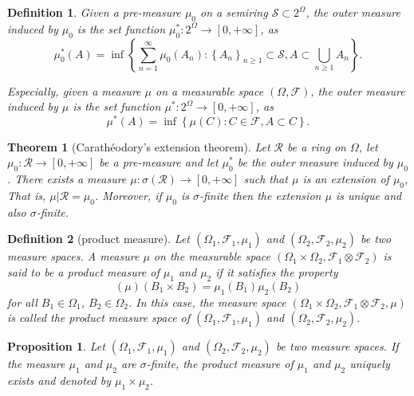 \documentclass{report}
\newtheorem{definition}{Definition}[section]
\newtheorem{theorem}{Theorem}[section]
\newtheorem{proposition}{Proposition}[section]
\theoremstyle{nonumberplain}
\begin{document}
\begin{definition}
	Given a pre-measure $\mu_0$ on a semiring $\mathcal{S}\subset2^\Omega$, the \emph{outer measure induced by $\mu_0$} is the set function $\mu_0^*:2^\Omega\to[0,+\infty]$, as
	\[
	\mu^{*}_0(A) = \inf \left\{\sum_{n=1}^{\infty} \mu_0\left(A_{n}\right):\left\{A_{n}\right\}_{n \geq 1} \subset \mathcal{S}, A \subset \bigcup_{n \geq 1} A_{n}\right\}.
	\]

	Especially, given a measure $\mu$ on a measurable space $(\Omega,\mathcal{F})$, the \emph{outer measure induced by $\mu$} is the set function $\mu^*:2^\Omega\to[0,+\infty]$, as
	\[
	\mu^{*}(A) = \inf \left\{ \mu\left(C\right):C \in\mathcal{F}, A \subset C\right\}.
	\]
\end{definition}

\begin{theorem}[Carathéodory's extension theorem]
	Let $\mathcal{R}$ be a ring on $\Omega$, let $\mu_0:\mathcal{R}\to[0,+\infty]$ be a pre-measure and let $\mu_0^*$ be the outer measure induced by $\mu_0$. There exists a measure $\mu:\sigma(\mathcal{R})\to[0, +\infty]$ such that $\mu$ is an extension of $\mu_0$, That is, $\mu|\mathcal{R} =\mu_0$. Moreover, if $\mu_0$ is $\sigma$-finite then the extension $\mu$ is unique and also $\sigma$-finite.
\end{theorem}

\begin{definition}[product measure]
	Let $(\Omega_1,\mathcal{F}_1,\mu_1)$ and $(\Omega_2,\mathcal{F}_2,\mu_2)$ be two measure spaces. 
	A measure $\mu$ on the measurable space $(\Omega_1\times\Omega_2,\mathcal{F}_1\otimes\mathcal{F}_2)$ is said to be a \emph{product measure} of $\mu_1$ and $\mu_2$ if it satisfies the property
	\[
	\left(\mu\right)\left(B_{1} \times B_{2}\right)=\mu_{1}\left(B_{1}\right) \mu_{2}\left(B_{2}\right)
	\]
	for all $B_1\in\Omega_1$, $B_2\in\Omega_2$. In this case, the measure space $(\Omega_1\times\Omega_2,\mathcal{F}_1\otimes\mathcal{F}_2,\mu)$ is called the product measure space of $(\Omega_1,\mathcal{F}_1,\mu_1)$ and $(\Omega_2,\mathcal{F}_2,\mu_2)$.
\end{definition}

\begin{proposition}
	Let $(\Omega_1,\mathcal{F}_1,\mu_1)$ and $(\Omega_2,\mathcal{F}_2,\mu_2)$ be two measure spaces. If the measure $\mu_1$ and $\mu_2$ are $\sigma$-finite, the product measure of $\mu_1$ and $\mu_2$ uniquely exists and denoted by $\mu_1\times\mu_2$.
\end{proposition}
\end{document}
